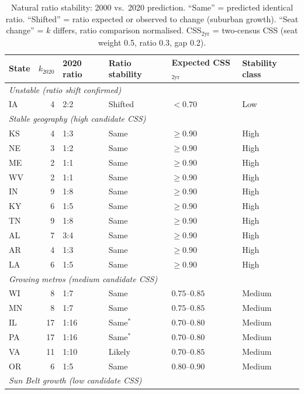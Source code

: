 \begin{table}[h]
\centering
\caption{Natural ratio stability: 2000 vs.\ 2020 prediction.
  ``Same'' = predicted identical ratio.
  ``Shifted'' = ratio expected or observed to change (suburban growth).
  ``Seat change'' = $k$ differs, ratio comparison normalised.
  CSS$_{2\text{yr}}$ = two-census CSS (seat weight 0.5, ratio 0.3, gap 0.2).}
\label{tab:ratio-stability}
\small
\begin{tabular}{l r l l l l}
\toprule
State & $k_{2020}$ & 2020 ratio & Ratio stability & Expected CSS$_{2\text{yr}}$ & Stability class \\
\midrule
\multicolumn{6}{l}{\textit{Unstable (ratio shift confirmed)}} \\
IA  &  4 & 2:2  & Shifted  & $< 0.70$    & Low \\
\midrule
\multicolumn{6}{l}{\textit{Stable geography (high candidate CSS)}} \\
KS  &  4 & 1:3  & Same     & $\geq 0.90$ & High \\
NE  &  3 & 1:2  & Same     & $\geq 0.90$ & High \\
ME  &  2 & 1:1  & Same     & $\geq 0.90$ & High \\
WV  &  2 & 1:1  & Same     & $\geq 0.90$ & High \\
IN  &  9 & 1:8  & Same     & $\geq 0.90$ & High \\
KY  &  6 & 1:5  & Same     & $\geq 0.90$ & High \\
TN  &  9 & 1:8  & Same     & $\geq 0.90$ & High \\
AL  &  7 & 3:4  & Same     & $\geq 0.90$ & High \\
AR  &  4 & 1:3  & Same     & $\geq 0.90$ & High \\
LA  &  6 & 1:5  & Same     & $\geq 0.90$ & High \\
\midrule
\multicolumn{6}{l}{\textit{Growing metros (medium candidate CSS)}} \\
WI  &  8 & 1:7  & Same     & $0.75$--$0.85$ & Medium \\
MN  &  8 & 1:7  & Same     & $0.75$--$0.85$ & Medium \\
IL  & 17 & 1:16 & Same$^*$ & $0.70$--$0.80$ & Medium \\
PA  & 17 & 1:16 & Same$^*$ & $0.70$--$0.80$ & Medium \\
VA  & 11 & 1:10 & Likely   & $0.70$--$0.85$ & Medium \\
OR  &  6 & 1:5  & Same     & $0.80$--$0.90$ & Medium \\
\midrule
\multicolumn{6}{l}{\textit{Sun Belt growth (low candidate CSS)}} \\

\end{tabular}
\end{table}
